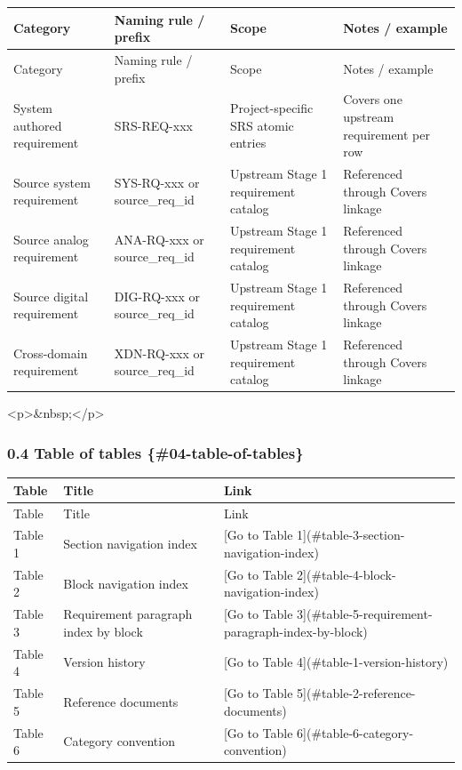 \documentclass[11pt]{article}
\begin{document}
\begin{longtable}{|p{}|p{}|p{}|p{}|}
\hline
Category & Naming rule / prefix & Scope & Notes / example \\
\hline
\endfirsthead
\hline
Category & Naming rule / prefix & Scope & Notes / example \\
\hline
\endhead
System authored requirement & SRS-REQ-xxx & Project-specific SRS atomic entries & Covers one upstream requirement per row \\
\hline
Source system requirement & SYS-RQ-xxx or source\_req\_id & Upstream Stage 1 requirement catalog & Referenced through Covers linkage \\
\hline
Source analog requirement & ANA-RQ-xxx or source\_req\_id & Upstream Stage 1 requirement catalog & Referenced through Covers linkage \\
\hline
Source digital requirement & DIG-RQ-xxx or source\_req\_id & Upstream Stage 1 requirement catalog & Referenced through Covers linkage \\
\hline
Cross-domain requirement & XDN-RQ-xxx or source\_req\_id & Upstream Stage 1 requirement catalog & Referenced through Covers linkage \\
\hline
\end{longtable}


<p>\&nbsp;</p>

\subsubsection{0.4 Table of tables \{\#04-table-of-tables\}}


\begin{longtable}{|p{}|p{}|p{}|}
\hline
Table & Title & Link \\
\hline
\endfirsthead
\hline
Table & Title & Link \\
\hline
\endhead
Table 1 & Section navigation index & [Go to Table 1](\#table-3-section-navigation-index) \\
\hline
Table 2 & Block navigation index & [Go to Table 2](\#table-4-block-navigation-index) \\
\hline
Table 3 & Requirement paragraph index by block & [Go to Table 3](\#table-5-requirement-paragraph-index-by-block) \\
\hline
Table 4 & Version history & [Go to Table 4](\#table-1-version-history) \\
\hline
Table 5 & Reference documents & [Go to Table 5](\#table-2-reference-documents) \\
\hline
Table 6 & Category convention & [Go to Table 6](\#table-6-category-convention) \\
\hline
\end{longtable}
\end{document}
